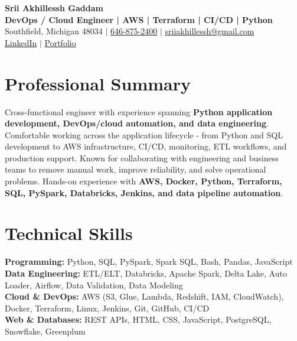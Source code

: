 \documentclass[letterpaper,10pt]{article}
\begin{document}
\fontsize{9.35pt}{10.45pt}\selectfont

\begin{center}
    {\LARGE \textbf{Srii Akhillessh Gaddam}} \\[-1pt]
    \textbf{DevOps / Cloud Engineer | AWS | Terraform | CI/CD | Python} \\[2pt]
    Southfield, Michigan 48034 $|$
    \href{tel:6468752400}{646-875-2400} $|$
    \href{mailto:sriiakhillessh@gmail.com}{sriiakhillessh@gmail.com} \\[1pt]
    \href{https://www.linkedin.com/in/srii-akhiilessh-gaddam-b48668191/}{LinkedIn} $|$
    \href{https://sriiakhillesshg.github.io/portfolio/}{Portfolio}
\end{center}
\vspace{-8pt}

\section{Professional Summary}
\small{Cross-functional engineer with experience spanning \textbf{Python application development, DevOps/cloud automation, and data engineering}. Comfortable working across the application lifecycle - from Python and SQL development to AWS infrastructure, CI/CD, monitoring, ETL workflows, and production support. Known for collaborating with engineering and business teams to remove manual work, improve reliability, and solve operational problems. Hands-on experience with \textbf{AWS, Docker, Python, Terraform, SQL, PySpark, Databricks, Jenkins, and data pipeline automation}.}

\section{Technical Skills}
\small{
\textbf{Programming:} Python, SQL, PySpark, Spark SQL, Bash, Pandas, JavaScript \\
\textbf{Data Engineering:} ETL/ELT, Databricks, Apache Spark, Delta Lake, Auto Loader, Airflow, Data Validation, Data Modeling \\
\textbf{Cloud \& DevOps:} AWS (S3, Glue, Lambda, Redshift, IAM, CloudWatch), Docker, Terraform, Linux, Jenkins, Git, GitHub, CI/CD \\
\textbf{Web \& Databases:} REST APIs, HTML, CSS, JavaScript, PostgreSQL, Snowflake, Greenplum
}
\end{document}
